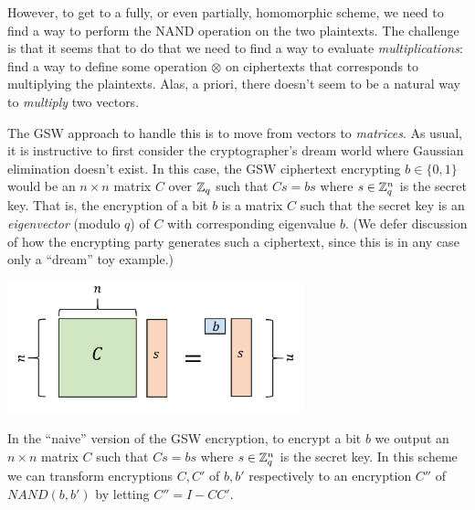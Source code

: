 However, to get to a fully, or even partially, homomorphic scheme, we
need to find a way to perform the NAND operation on the two plaintexts.
The challenge is that it seems that to do that we need to find a way to
evaluate \emph{multiplications}: find a way to define some operation
\(\otimes\) on ciphertexts that corresponds to multiplying the
plaintexts. Alas, a priori, there doesn't seem to be a natural way to
\emph{multiply} two vectors.

The GSW approach to handle this is to move from vectors to
\emph{matrices}. As usual, it is instructive to first consider the
cryptographer's dream world where Gaussian elimination doesn't exist. In
this case, the GSW ciphertext encrypting \(b\in\{0,1\}\) would be an
\(n\times n\) matrix \(C\) over \({\mathbb{Z}}_q\) such that \(Cs = bs\) where
\(s\in{\mathbb{Z}}_q^n\) is the secret key. That is, the encryption of a bit \(b\)
is a matrix \(C\) such that the secret key is an \emph{eigenvector}
(modulo \(q\)) of \(C\) with corresponding eigenvalue \(b\). (We defer
discussion of how the encrypting party generates such a ciphertext,
since this is in any case only a ``dream'' toy example.)



\begin{marginfigure}
\centering
\includegraphics[width=\linewidth, height=1.5in, keepaspectratio]{../figure/naivegsw.png}
\caption{In the ``naive'' version of the GSW encryption, to encrypt a
bit \(b\) we output an \(n\times n\) matrix \(C\) such that \(Cs=bs\)
where \(s \in {\mathbb{Z}}_q^n\) is the secret key. In this scheme we can
transform encryptions \(C,C'\) of \(b,b'\) respectively to an encryption
\(C''\) of \(\ensuremath{\mathit{NAND}}(b,b')\) by letting
\(C'' = I-CC'\).}
\label{naivegswfig}
\end{marginfigure}

